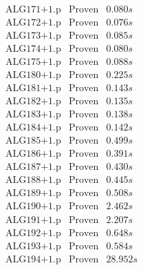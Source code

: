 \documentclass[a4paper,11pt]{report}
\theoremstyle{definition}
\theoremstyle{definition}
\theoremstyle{definition}
\theoremstyle{definition}
\theoremstyle{definition}
\theoremstyle{definition}
\theoremstyle{definition}
\begin{document}
\begin{minipage}{0.45\textwidth}
\[\begin{matrix}
			\text{ALG171+1.p}&\text{Proven}& 0.080 s\\
			\text{ALG172+1.p}&\text{Proven}& 0.076 s\\
			\text{ALG173+1.p}&\text{Proven}& 0.085 s\\
			\text{ALG174+1.p}&\text{Proven}& 0.080 s\\
			\text{ALG175+1.p}&\text{Proven}& 0.088 s\\
			\text{ALG180+1.p}&\text{Proven}& 0.225 s\\
			\text{ALG181+1.p}&\text{Proven}& 0.143 s\\
			\text{ALG182+1.p}&\text{Proven}& 0.135 s\\
			\text{ALG183+1.p}&\text{Proven}& 0.138 s\\
			\text{ALG184+1.p}&\text{Proven}& 0.142 s\\
			\text{ALG185+1.p}&\text{Proven}& 0.499 s\\
			\text{ALG186+1.p}&\text{Proven}& 0.391 s\\
			\text{ALG187+1.p}&\text{Proven}& 0.430 s\\
			\text{ALG188+1.p}&\text{Proven}& 0.445 s\\
			\text{ALG189+1.p}&\text{Proven}& 0.508 s\\
			\text{ALG190+1.p}&\text{Proven}& 2.462 s\\
			\text{ALG191+1.p}&\text{Proven}& 2.207 s\\
			\text{ALG192+1.p}&\text{Proven}& 0.648 s\\
			\text{ALG193+1.p}&\text{Proven}& 0.584 s\\
			\text{ALG194+1.p}&\text{Proven}& 28.952 s\\
		\end{matrix}\]
	\end{minipage}
	
	\pagebreak
	
\end{document}
